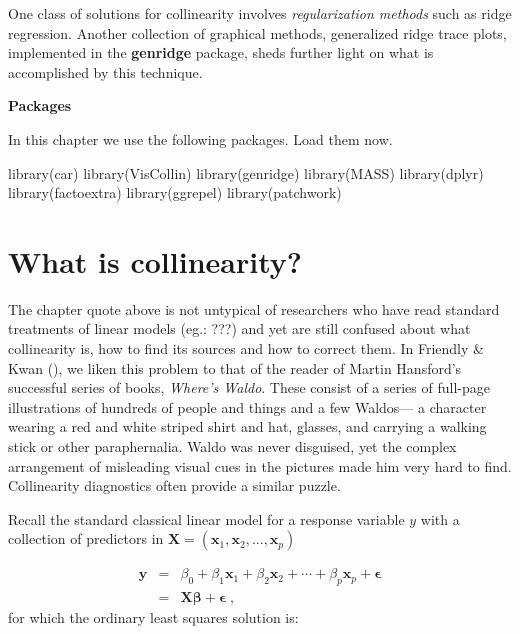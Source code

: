 \documentclass[
  letterpaper,
  10pt,
  krantz2]{krantz}
\makeatletter
\newenvironment{Shaded}{\begin{snugshade}}{\end{snugshade}}
\newcommand{\FunctionTok}[1]{\textcolor[rgb]{0.28,0.35,0.67}{#1}}
\newcommand{\NormalTok}[1]{\textcolor[rgb]{0.00,0.23,0.31}{#1}}
\newenvironment{kframe}{%
  \medskip{}
  \setlength{\fboxsep}{.8em}
  \def\at@end@of@kframe{}%
  \ifinner\ifhmode%
  \def\at@end@of@kframe{\end{minipage}}%
  \begin{minipage}{\columnwidth}%
  \fi\fi%
  \def\FrameCommand##1{\hskip\@totalleftmargin \hskip-\fboxsep
  \colorbox{shadecolor}{##1}\hskip-\fboxsep
      \hskip-\linewidth \hskip-\@totalleftmargin \hskip\columnwidth}%
  \MakeFramed {\advance\hsize-\width
    \@totalleftmargin\z@ \linewidth\hsize
    \@setminipage}}%
{\par\unskip\endMakeFramed%
  \at@end@of@kframe}
\renewenvironment{Shaded}{\begin{kframe}}{\end{kframe}}
\makeatother
\begin{document}
One class of solutions for collinearity involves \emph{regularization
methods} such as ridge regression. Another collection of graphical
methods, generalized ridge trace plots, implemented in the
\textbf{genridge} package, sheds further light on what is accomplished
by this technique.

\textbf{Packages}

In this chapter we use the following packages. Load them now.

\begin{Shaded}
\begin{Highlighting}[]
\FunctionTok{library}\NormalTok{(car)}
\FunctionTok{library}\NormalTok{(VisCollin)}
\FunctionTok{library}\NormalTok{(genridge)}
\FunctionTok{library}\NormalTok{(MASS)}
\FunctionTok{library}\NormalTok{(dplyr)}
\FunctionTok{library}\NormalTok{(factoextra)}
\FunctionTok{library}\NormalTok{(ggrepel)}
\FunctionTok{library}\NormalTok{(patchwork)}
\end{Highlighting}
\end{Shaded}

\section{What is collinearity?}\label{what-is-collinearity}

The chapter quote above is not untypical of researchers who have read
standard treatments of linear models (eg.: ???) and yet are still
confused about what collinearity is, how to find its sources and how to
correct them. In Friendly \& Kwan
(), we liken this problem to that
of the reader of Martin Hansford's successful series of books,
\emph{Where's Waldo}. These consist of a series of full-page
illustrations of hundreds of people and things and a few Waldos--- a
character wearing a red and white striped shirt and hat, glasses, and
carrying a walking stick or other paraphernalia. Waldo was never
disguised, yet the complex arrangement of misleading visual cues in the
pictures made him very hard to find. Collinearity diagnostics often
provide a similar puzzle.

Recall the standard classical linear model for a response variable \(y\)
with a collection of predictors in
\(\mathbf{X} = (\mathbf{x}_1, \mathbf{x}_2, ..., \mathbf{x}_p)\)

\begin{eqnarray*}
\mathbf{y} & =&  \beta_0 + \beta_1 \mathbf{x}_1 + \beta_2 \mathbf{x}_2 + \cdots + \beta_p \mathbf{x}_p + \mathbf{\epsilon} \\
         & = & \mathbf{X} \mathbf{\beta} + \mathbf{\epsilon} \; ,
\end{eqnarray*} for which the ordinary least squares solution is:
\end{document}
